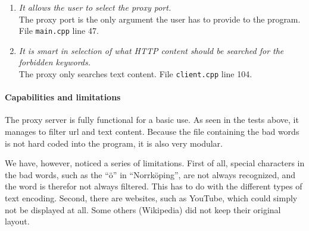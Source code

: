 \documentclass[12pt,a4paper]{article}
\begin{document}
\begin{enumerate}
\item \textit{It allows the user to select the proxy port.}\\
The proxy port is the only argument the user has to provide to the program. File \texttt{main.cpp} line 47.

\item \textit{It is smart in selection of what HTTP content should be searched for the forbidden keywords.}\\
The proxy only searches text content. File \texttt{client.cpp} line 104.

\end{enumerate}


\paragraph{Capabilities and limitations}
The proxy server is fully functional for a basic use. As seen in the tests above, it manages to filter url and text content. Because the file containing the bad words is not hard coded into the program, it is also very modular.

We have, however, noticed a series of limitations. First of all, special characters in the bad words, such as the ``ö'' in ``Norrköping'', are not always recognized, and the word is therefor not always filtered. This has to do with the different types of text encoding.
Second, there are websites, such as YouTube, which could simply not be displayed at all. Some others (Wikipedia) did not keep their original layout.
    
\end{document}
